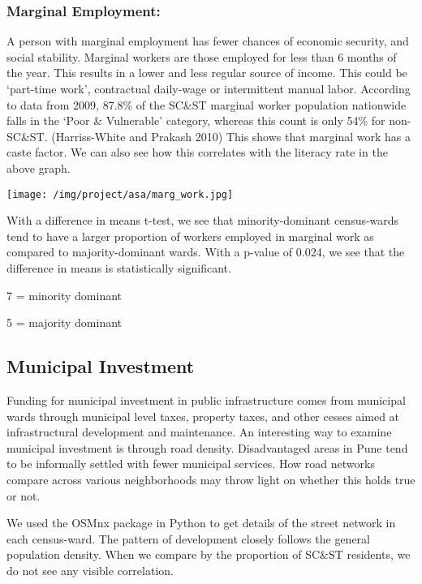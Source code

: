 \documentclass[
]{article}
\begin{document}
\hypertarget{marginal-employment}{%
\subsubsection{Marginal Employment:}\label{marginal-employment}}

A person with marginal employment has fewer chances of economic
security, and social stability. Marginal workers are those employed for
less than 6 months of the year. This results in a lower and less regular
source of income. This could be `part-time work', contractual daily-wage
or intermittent manual labor. According to data from 2009, 87.8\% of the
SC\&ST marginal worker population nationwide falls in the `Poor \&
Vulnerable' category, whereas this count is only 54\% for non-SC\&ST.
(Harriss-White and Prakash 2010) This shows that marginal work has a
caste factor. We can also see how this correlates with the literacy rate
in the above graph.

\texttt{[image: /img/project/asa/marg\_work.jpg]}

With a difference in means t-test, we see that minority-dominant
census-wards tend to have a larger proportion of workers employed in
marginal work as compared to majority-dominant wards. With a p-value of
0.024, we see that the difference in means is statistically significant.

7 = minority dominant

5 = majority dominant

\hypertarget{municipal-investment}{%
\subsection{Municipal Investment}\label{municipal-investment}}

Funding for municipal investment in public infrastructure comes from
municipal wards through municipal level taxes, property taxes, and other
cesses aimed at infrastructural development and maintenance. An
interesting way to examine municipal investment is through road density.
Disadvantaged areas in Pune tend to be informally settled with fewer
municipal services. How road networks compare across various
neighborhoods may throw light on whether this holds true or not.

We used the OSMnx package in Python to get details of the street network
in each census-ward. The pattern of development closely follows the
general population density. When we compare by the proportion of SC\&ST
residents, we do not see any visible correlation.
\end{document}
